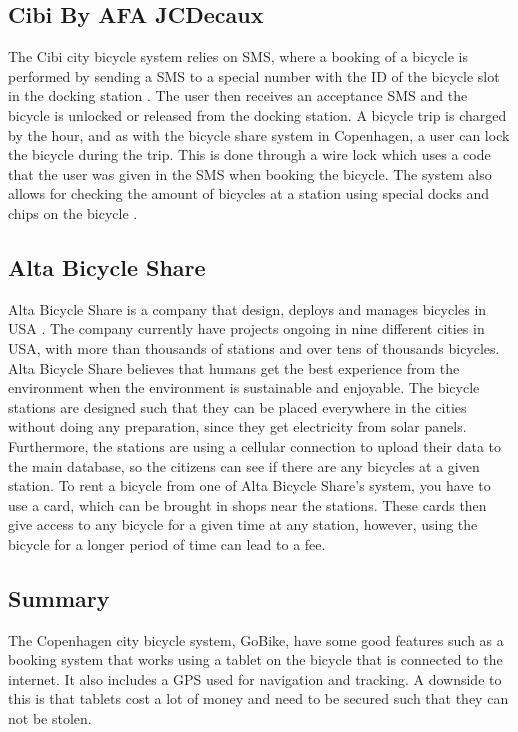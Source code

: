 \subsection{Cibi By AFA JCDecaux}
The Cibi city bicycle system relies on SMS, where a booking of a bicycle is performed by sending a SMS to a special number with the ID of the bicycle slot in the docking station \citep{misc:cibi}. 
The user then receives an acceptance SMS and the bicycle is unlocked or released from the docking station. 
A bicycle trip is charged by the hour, and as with the bicycle share system in Copenhagen, a user can lock the bicycle during the trip. 
This is done through a wire lock which uses a code that the user was given in the SMS when booking the bicycle.
The system also allows for checking the amount of bicycles at a station using special docks and chips on the bicycle \citep{misc:omcibi}.

\subsection{Alta Bicycle Share}
Alta Bicycle Share is a company that design, deploys and manages bicycles in USA \citep{misc:AltaBicycleShare}.
The company currently have projects ongoing in nine different cities in USA, with more than thousands of stations and over tens of thousands bicycles. 
Alta Bicycle Share believes that humans get the best experience from the environment when the environment is sustainable and enjoyable.
The bicycle stations are designed such that they can be placed everywhere in the cities without doing any preparation, since they get electricity from solar panels.
Furthermore, the stations are using a cellular connection to upload their data to the main database, so the citizens can see if there are any bicycles at a given station.
To rent a bicycle from one of Alta Bicycle Share's system, you have to use a card, which can be brought in shops near the stations.
These cards then give access to any bicycle for a given time at any station, however, using the bicycle for a longer period of time can lead to a fee.

\subsection{Summary}
The Copenhagen city bicycle system, GoBike, have some good features such as a booking system that works using a tablet on the bicycle that is connected to the internet.
It also includes a GPS used for navigation and tracking.
A downside to this is that tablets cost a lot of money and need to be secured such that they can not be stolen. 

